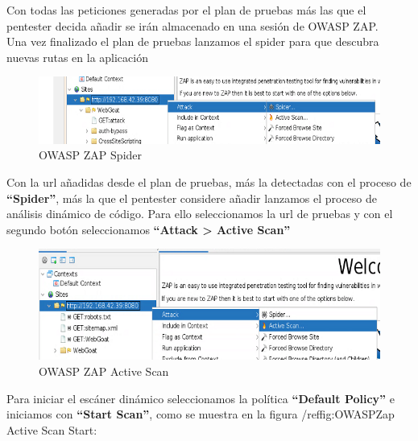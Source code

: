 Con todas las peticiones generadas por el plan de pruebas más las que el pentester decida añadir se irán almacenado 
en una sesión de OWASP ZAP.\\

Una vez finalizado el plan de pruebas lanzamos el spider para que descubra nuevas rutas en la aplicación

\begin{figure}[!htb]
    \centering
    \captionsetup{width=1\linewidth}  
    \includegraphics[width=\linewidth]{./imagenes/03_01_WebGoat_ZapProxySpider.png}
    \caption{OWASP ZAP Spider}  
    \label{fig:OWASPZap Spider}
\end{figure}

\newpage
Con la url añadidas desde el plan de pruebas, más la detectadas con el proceso de \textbf{“Spider”}, más la que el 
pentester considere añadir lanzamos el proceso de análisis dinámico de código. Para ello seleccionamos la url de pruebas 
y con el segundo botón seleccionamos \textbf{“Attack > Active Scan”}

\begin{figure}[!htb]
    \centering
    \captionsetup{width=1\linewidth}  
    \includegraphics[width=\linewidth]{./imagenes/03_02_WebGoat_ZapProxyActiveScan.png}
    \caption{OWASP ZAP Active Scan}  
    \label{fig:OWASPZap Active Scan}
\end{figure}

Para iniciar el escáner dinámico seleccionamos la política \textbf{“Default Policy”} e iniciamos con 
\textbf{“Start Scan”}, como se muestra en la figura /ref{fig:OWASPZap Active Scan Start}:

